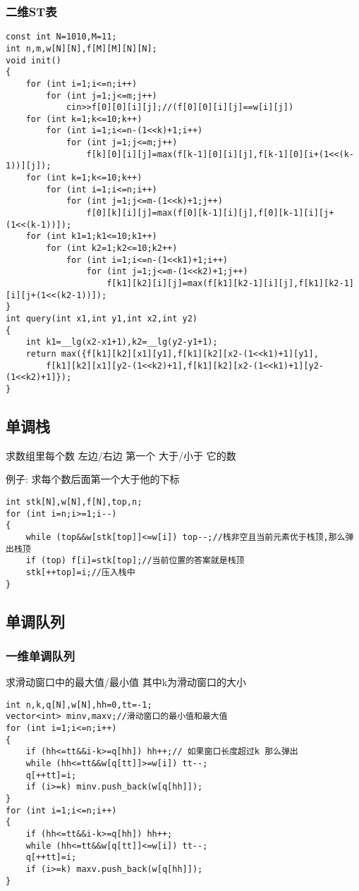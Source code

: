 \documentclass[a4paper]{ctexart}
\begin{document}
\subsubsection{二维ST表}
\begin{lstlisting}
const int N=1010,M=11;
int n,m,w[N][N],f[M][M][N][N];
void init()
{
    for (int i=1;i<=n;i++)
        for (int j=1;j<=m;j++)
            cin>>f[0][0][i][j];//(f[0][0][i][j]==w[i][j])
    for (int k=1;k<=10;k++)
        for (int i=1;i<=n-(1<<k)+1;i++)
            for (int j=1;j<=m;j++)
                f[k][0][i][j]=max(f[k-1][0][i][j],f[k-1][0][i+(1<<(k-1))][j]);
    for (int k=1;k<=10;k++)
        for (int i=1;i<=n;i++)
            for (int j=1;j<=m-(1<<k)+1;j++)
                f[0][k][i][j]=max(f[0][k-1][i][j],f[0][k-1][i][j+(1<<(k-1))]);
    for (int k1=1;k1<=10;k1++)
        for (int k2=1;k2<=10;k2++)
            for (int i=1;i<=n-(1<<k1)+1;i++)
                for (int j=1;j<=m-(1<<k2)+1;j++)
                    f[k1][k2][i][j]=max(f[k1][k2-1][i][j],f[k1][k2-1][i][j+(1<<(k2-1))]);
}
int query(int x1,int y1,int x2,int y2) 
{
    int k1=__lg(x2-x1+1),k2=__lg(y2-y1+1);
    return max({f[k1][k2][x1][y1],f[k1][k2][x2-(1<<k1)+1][y1],
        f[k1][k2][x1][y2-(1<<k2)+1],f[k1][k2][x2-(1<<k1)+1][y2-(1<<k2)+1]});
}
\end{lstlisting}

\subsection{单调栈}

求数组里每个数 \quad 左边/右边 \quad 第一个 \quad 大于/小于 \quad 它的数

例子: 求每个数后面第一个大于他的下标
\begin{lstlisting}
int stk[N],w[N],f[N],top,n;
for (int i=n;i>=1;i--)
{
    while (top&&w[stk[top]]<=w[i]) top--;//栈非空且当前元素优于栈顶,那么弹出栈顶
    if (top) f[i]=stk[top];//当前位置的答案就是栈顶
    stk[++top]=i;//压入栈中
}
\end{lstlisting}

\subsection{单调队列}

\subsubsection{一维单调队列}

求滑动窗口中的最大值/最小值 其中k为滑动窗口的大小
\begin{lstlisting}
int n,k,q[N],w[N],hh=0,tt=-1;
vector<int> minv,maxv;//滑动窗口的最小值和最大值
for (int i=1;i<=n;i++)
{
    if (hh<=tt&&i-k>=q[hh]) hh++;// 如果窗口长度超过k 那么弹出
    while (hh<=tt&&w[q[tt]]>=w[i]) tt--;
    q[++tt]=i;
    if (i>=k) minv.push_back(w[q[hh]]);
}
for (int i=1;i<=n;i++)
{
    if (hh<=tt&&i-k>=q[hh]) hh++;
    while (hh<=tt&&w[q[tt]]<=w[i]) tt--;
    q[++tt]=i;
    if (i>=k) maxv.push_back(w[q[hh]]);
}
\end{lstlisting}
\end{document}
